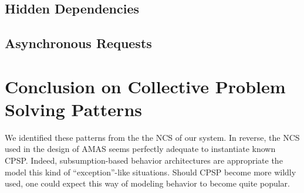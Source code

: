 \subsection{Hidden Dependencies}

\subsection{Asynchronous Requests}

\section{Conclusion on Collective Problem Solving Patterns}
We identified these patterns from the the NCS of our system. In reverse, the NCS used in the design of AMAS seems perfectly adequate to instantiate known CPSP. Indeed, subsumption-based behavior architectures are appropriate the model this kind of \enquote{exception}-like situations. Should CPSP become more wildly used, one could expect this way of modeling behavior to become quite popular.